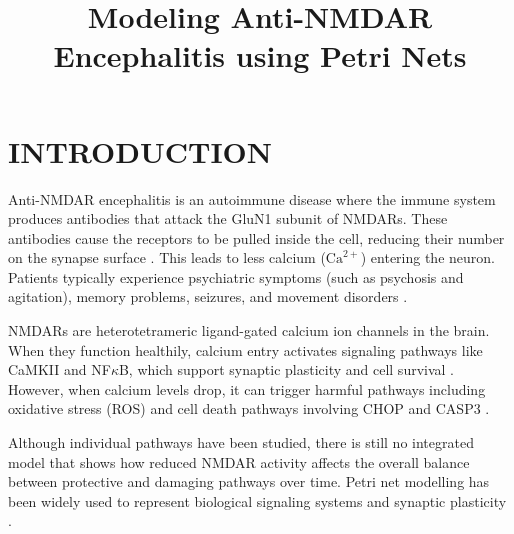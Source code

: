 \documentclass[a4paper,twoside]{article}
\begin{document}
\title{Modeling Anti-NMDAR Encephalitis using Petri Nets}

\author{
}



\onecolumn \maketitle \normalsize \setcounter{footnote}{0} \vfill

\section{\uppercase{Introduction}}
\label{sec:introduction}
Anti-NMDAR encephalitis is an autoimmune disease where the immune system produces antibodies that attack the GluN1 subunit of NMDARs. These antibodies cause the receptors to be pulled inside the cell, reducing their number on the synapse surface \cite{linse1991calcium}. This leads to less calcium ($\text{Ca}^{2+}$) entering the neuron. Patients typically experience psychiatric symptoms (such as psychosis and agitation), memory problems, seizures, and movement disorders \cite{bhalla1999emergent}.

NMDARs are heterotetrameric ligand-gated calcium ion channels in the brain. When they function healthily, calcium entry activates signaling pathways like CaMKII and NF$\kappa$B, which support synaptic plasticity and cell survival \cite{bhalla2002}. However, when calcium levels drop, it can trigger harmful pathways including oxidative stress (ROS) and cell death pathways involving CHOP and CASP3 \cite{ROSCHOP1_apoptosis_ER_stress, CHOP1_ER_stress, CASP3_CASP9_CASP7}.

Although individual pathways have been studied, there is still no integrated model that shows how reduced NMDAR activity affects the overall balance between protective and damaging pathways over time. Petri net modelling has been widely used to represent biological signaling systems and synaptic plasticity \cite{hardy2005petri, matsuno2003hfpn}.
\end{document}
